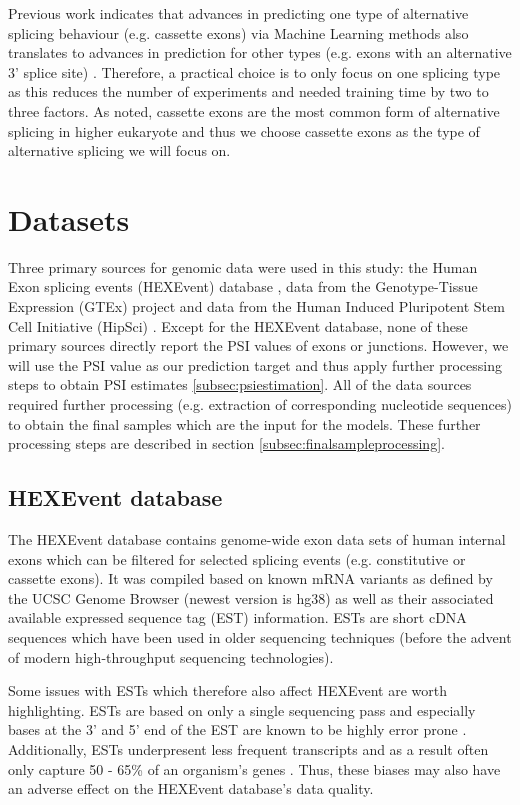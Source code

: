 Previous work indicates that advances in predicting one type of alternative splicing behaviour (e.g. cassette exons) via Machine Learning methods also translates to advances in prediction for other types (e.g. exons with an alternative 3' splice site) \cite{dsc} \cite{buschhertel}. Therefore, a practical choice is to only focus on one splicing type as this reduces the number of experiments and needed training time by two to three factors. As noted, cassette exons are the most common form of alternative splicing in higher eukaryote and thus we choose cassette exons as the type of alternative splicing we will focus on.

\section{Datasets}\label{sec:datasets}
Three primary sources for genomic data were used in this study: the Human Exon splicing events (HEXEvent) database \cite{hexevent}, data from the Genotype-Tissue Expression (GTEx) project \cite{gtex} and data from the Human Induced Pluripotent Stem Cell Initiative (HipSci) \cite{hipsci}. Except for the HEXEvent database, none of these primary sources directly report the PSI values of exons or junctions. However, we will use the PSI value as our prediction target and thus apply further processing steps to obtain PSI estimates \ref{subsec:psiestimation}. All of the data sources required further processing (e.g. extraction of corresponding nucleotide sequences) to obtain the final samples which are the input for the models. These further processing steps are described in section \ref{subsec:finalsampleprocessing}.


\subsection{HEXEvent database} \label{subsec:hexevent}
The HEXEvent database contains genome-wide exon data sets of human internal exons which can be filtered for selected splicing events (e.g. constitutive or cassette exons). It was compiled based on known mRNA variants as defined by the UCSC Genome Browser (newest version is hg38) as well as their associated available expressed sequence tag (EST) information. ESTs are short cDNA sequences which have been used in older sequencing techniques (before the advent of modern high-throughput sequencing technologies). 

Some issues with ESTs which therefore also affect HEXEvent are worth highlighting. ESTs are based on only a single sequencing pass and especially bases at the 3' and 5' end of the EST are known to be highly error prone \cite{hitchhiker}. Additionally, ESTs underpresent less frequent transcripts and as a result often only capture 50 - 65\% of an organism's genes \cite{estunderrepresenttransripts}. Thus, these biases may also have an adverse effect on the HEXEvent database's data quality.

